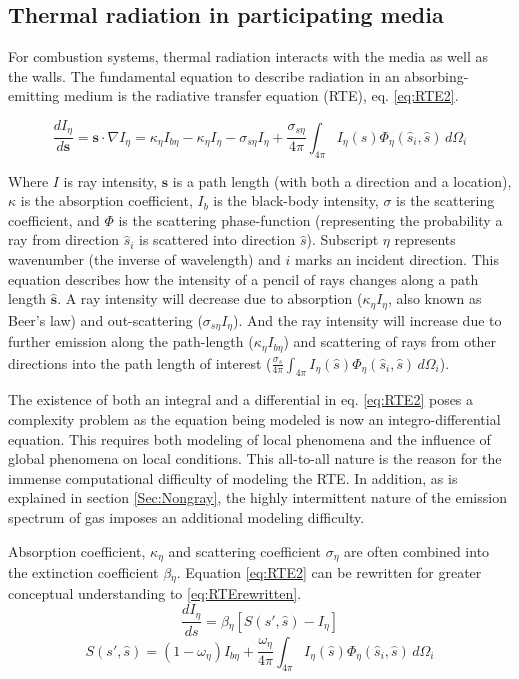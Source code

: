 \subsection{Thermal radiation in participating media} \label{section:RTE}
For combustion systems, thermal radiation interacts with the media as well as the walls. The fundamental equation to describe radiation in an absorbing-emitting medium is the radiative transfer equation (RTE), eq. \ref{eq:RTE2}.

\begin{equation}
    \frac{dI_\eta{}}{d\textbf{s}} = \textbf{s} \cdot \nabla{I_\eta{}} = \kappa{}_\eta{}I_{b\eta{}}-\kappa{}_\eta{}I_\eta{}-\sigma{}_{s\eta{}}I_\eta{}+\frac{\sigma{}_{s\eta{}}}{4\pi}\int_{4\pi{}}{I_\eta{}(\hat{s})\Phi_\eta{}(\hat{s}_i,\hat{s})}\,d\Omega{}_i
    \label{eq:RTE2}
\end{equation}

Where $I$ is ray intensity, $\textbf{s}$ is a path length (with both a direction and a location), $\kappa{}$ is the absorption coefficient, $I_b$ is the black-body intensity, $\sigma{}$ is the scattering coefficient, and $\Phi{}$ is the scattering phase-function (representing the probability a ray from direction $\hat{s}_i$ is scattered into direction $\hat{s}$). Subscript $\eta{}$ represents wavenumber (the inverse of wavelength) and $i$ marks an incident direction. This equation describes how the intensity of a pencil of rays changes along a path length $\hat{\textbf{s}}$. A ray intensity will decrease due to absorption ($\kappa{}_\eta{}I_\eta{}$, also known as Beer's law) and out-scattering ($\sigma{}_{s\eta{}}I_\eta{}$). And the ray intensity will increase due to further emission along the path-length ($\kappa{}_\eta{}I_{b\eta{}}$) and scattering of rays from other directions into the path length of interest ($\frac{\sigma{}_s}{4\pi}\int_{4\pi{}}{I_\eta{}(\hat{s})\Phi_\eta{}(\hat{s}_i,\hat{s})}\,d\Omega{}_i$). 

The existence of both an integral and a differential in eq. \ref{eq:RTE2} poses a complexity problem as the equation being modeled is now an integro-differential equation. 
This requires both modeling of local phenomena and the influence of global phenomena on local conditions. 
This all-to-all nature is the reason for the immense computational difficulty of modeling the RTE. 
In addition, as is explained in section \ref{Sec:Nongray}, the highly intermittent nature of the emission spectrum of gas imposes an additional modeling difficulty.

Absorption coefficient, $\kappa_{\eta{}}$ and scattering coefficient $\sigma{}_\eta{}$ are often combined into the extinction coefficient $\beta{}_\eta{}$. Equation \ref{eq:RTE2} can be rewritten for greater conceptual understanding to \ref{eq:RTErewritten}.
\begin{equation}
    \frac{dI_\eta{}}{ds} = \beta{}_\eta{}[S(s',\hat{s})-I_\eta{}]
    \label{eq:RTErewritten}
\end{equation}
\begin{equation}
    S(s',\hat{s}) = (1-\omega{}_\eta{})I_{b\eta{}}+\frac{\omega{}_\eta{}}{4\pi}\int_{4\pi{}}{I_\eta{}(\hat{s})\Phi_\eta{}(\hat{s}_i,\hat{s})}\,d\Omega{}_i
    \label{eq:RTE_S}
\end{equation}

